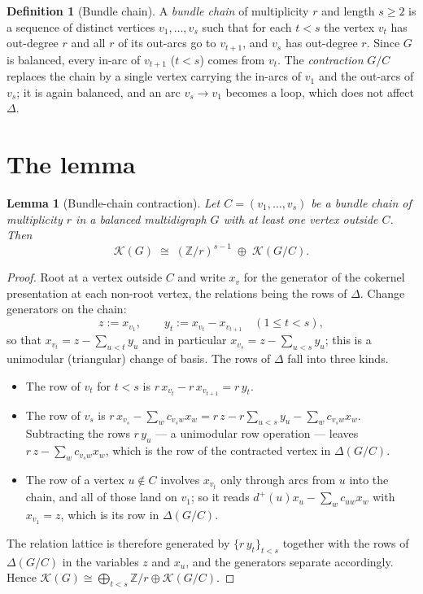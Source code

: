 \documentclass[11pt]{article}
\theoremstyle{plain}
\newtheorem{lemma}[theorem]{Lemma}
\theoremstyle{definition}
\newtheorem{definition}[theorem]{Definition}
\theoremstyle{remark}
\newcommand{\Z}{\mathbb{Z}}
\newcommand{\K}{\mathcal{K}}
\begin{document}
\begin{definition}[Bundle chain]\label{def:chain}
A \emph{bundle chain} of multiplicity $r$ and length $s\ge2$ is a sequence of distinct
vertices $v_1,\dots,v_s$ such that for each $t<s$ the vertex $v_t$ has out-degree $r$ and
all $r$ of its out-arcs go to $v_{t+1}$, and $v_s$ has out-degree $r$. Since $G$ is
balanced, every in-arc of $v_{t+1}$ ($t<s$) comes from $v_t$. The \emph{contraction}
$G/C$ replaces the chain by a single vertex carrying the in-arcs of $v_1$ and the
out-arcs of $v_s$; it is again balanced, and an arc $v_s\to v_1$ becomes a loop, which
does not affect $\Delta$.
\end{definition}

\section{The lemma}\label{sec:lemma}

\begin{lemma}[Bundle-chain contraction]\label{lem:bundle}
Let $C=(v_1,\dots,v_s)$ be a bundle chain of multiplicity $r$ in a balanced multidigraph
$G$ with at least one vertex outside $C$. Then
\[
\K(G)\;\cong\;(\Z/r)^{s-1}\;\oplus\;\K(G/C).
\]
\end{lemma}

\begin{proof}
Root at a vertex outside $C$ and write $x_v$ for the generator of the cokernel
presentation at each non-root vertex, the relations being the rows of $\Delta$. Change
generators on the chain:
\[
z:=x_{v_1},\qquad y_t:=x_{v_t}-x_{v_{t+1}}\quad(1\le t<s),
\]
so that $x_{v_t}=z-\sum_{u<t}y_u$ and in particular $x_{v_s}=z-\sum_{u<s}y_u$; this is a
unimodular (triangular) change of basis. The rows of $\Delta$ fall into three kinds.
\begin{itemize}
\item The row of $v_t$ for $t<s$ is $r\,x_{v_t}-r\,x_{v_{t+1}}=r\,y_t$.
\item The row of $v_s$ is $r\,x_{v_s}-\sum_w c_{v_sw}x_w
=r\,z-r\sum_{u<s}y_u-\sum_w c_{v_sw}x_w$. Subtracting the rows $r\,y_u$ --- a unimodular
row operation --- leaves $r\,z-\sum_w c_{v_sw}x_w$, which is the row of the contracted
vertex in $\Delta(G/C)$.
\item The row of a vertex $u\notin C$ involves $x_{v_t}$ only through arcs from $u$ into
the chain, and all of those land on $v_1$; so it reads $d^+(u)x_u-\sum_w c_{uw}x_w$ with
$x_{v_1}=z$, which is its row in $\Delta(G/C)$.
\end{itemize}
The relation lattice is therefore generated by $\{r\,y_t\}_{t<s}$ together with the rows
of $\Delta(G/C)$ in the variables $z$ and $x_u$, and the generators separate accordingly.
Hence $\K(G)\cong\bigoplus_{t<s}\Z/r\oplus\K(G/C)$.
\end{proof}
\end{document}
